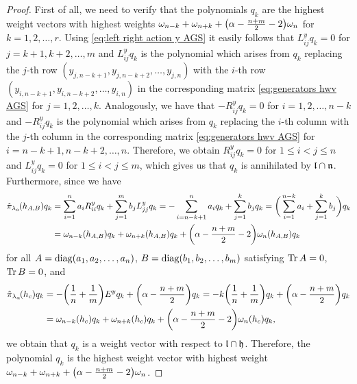 \begin{proof}First of all, we need to verify that the polynomials $q_k$ are the highest weight vectors with highest weights $\omega_{n-k}+\omega_{n+k}+\big(\alpha - {n + m \over 2} -2\big)\omega_n$ for $k=1,2,\dots,r$. Using \eqref{eq:left right action y AGS} it easily follows that $L^y_{ij}q_k=0$ for $j=k+1,k+2,\dots,m$ and $L^y_{ij}q_k$ is the polynomial which arises from $q_k$ replacing the $j$-th row $(y_{j,n-k+1},y_{j,n-k+2},\dots,y_{j,n})$  with the $i$-th row $(y_{i,n-k+1},y_{i,n-k+2},\dots,y_{i,n})$ in the corresponding matrix \eqref{eq:generators hwv AGS} for $j=1,2,\dots,k$. Analogously, we have that $-R^y_{ij}q_k=0$ for $i=1,2,\dots,n-k$ and $-R^y_{ij}q_k$ is the polynomial which arises from $q_k$ replacing the $i$-th column  with the $j$-th column  in the corresponding matrix \eqref{eq:generators hwv AGS} for $i=n-k+1,n-k+2,\dots,n$. Therefore, we obtain $R^y_{ij}q_k=0$ for $1 \leq i < j \leq n$ and $L^y_{ij}q_k=0$ for $1 \leq i < j \leq m$, which gives us that $q_k$ is annihilated by $\mathfrak{l} \cap \mathfrak{n}$. Furthermore, since we have
\begin{align*}
  \hat{\pi}_{\lambda_\alpha}\!(h_{A,B})q_k &= \sum_{i=1}^n a_i R^y_{ii}q_k + \sum_{j=1}^m b_j L^y_{jj}q_k = -\sum_{i=n-k+1}^n a_i q_k + \sum_{j=1}^k b_j q_k
  = \bigg(\sum_{i=1}^{n-k} a_i + \sum_{j=1}^k b_j \bigg)q_k \\
  &= \omega_{n-k}(h_{A,B})q_k + \omega_{n+k}(h_{A,B})q_k+ \bigg(\alpha-{n+m \over 2}-2\bigg)\omega_n(h_{A,B})q_k
\end{align*}
for all $A=\mathop {\rm diag} \nolimits(a_1,a_2,\dots,a_n)$, $B=\mathop {\rm diag} \nolimits(b_1,b_2,\dots,b_m)$ satisfying $\operatorname{\mathrm{Tr}} A=0$, $\operatorname{\mathrm{Tr}} B=0$, and
\begin{align*}
  \hat{\pi}_{\lambda_\alpha}\!(h_c)q_k&= -\bigg({1 \over n} + {1 \over m}\bigg)E^yq_k + \bigg(\alpha -{n+m \over 2}\bigg)q_k = -k\bigg({1 \over n} + {1 \over m}\bigg)q_k+ \bigg(\alpha -{n+m \over 2}\bigg)q_k \\
  &= \omega_{n-k}(h_c)q_k + \omega_{n+k}(h_c)q_k+\bigg(\alpha-{n+m \over 2}-2\bigg)\omega_n(h_c)q_k,
\end{align*}
we obtain that $q_k$ is a weight vector with respect to $\mathfrak{l} \cap \mathfrak{h}$. Therefore, the polynomial $q_k$ is the highest weight vector with highest weight $\omega_{n-k}+ \omega_{n+k} + \big(\alpha-{n+m \over 2}-2\big)\omega_n$.


\end{proof}
